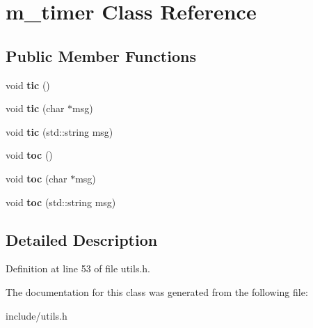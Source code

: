\hypertarget{classm__timer}{\section{m\+\_\+timer Class Reference}
\label{classm__timer}
}
\subsection*{Public Member Functions}
\begin{DoxyCompactItemize}
\item 
\hypertarget{classm__timer_ab4e75df9694f1693273a4766c2d99636}{void {\bfseries tic} ()}\label{classm__timer_ab4e75df9694f1693273a4766c2d99636}

\item 
\hypertarget{classm__timer_a833afaf3686ebe376e15571956399fd0}{void {\bfseries tic} (char $\ast$msg)}\label{classm__timer_a833afaf3686ebe376e15571956399fd0}

\item 
\hypertarget{classm__timer_a8ada933033e5cc9dc48e430a66616e06}{void {\bfseries tic} (std\+::string msg)}\label{classm__timer_a8ada933033e5cc9dc48e430a66616e06}

\item 
\hypertarget{classm__timer_a8b1126faa1d4ec46f724258f25770bff}{void {\bfseries toc} ()}\label{classm__timer_a8b1126faa1d4ec46f724258f25770bff}

\item 
\hypertarget{classm__timer_a7638ace7f392731c895765235360783c}{void {\bfseries toc} (char $\ast$msg)}\label{classm__timer_a7638ace7f392731c895765235360783c}

\item 
\hypertarget{classm__timer_ad351a19d033954aa263e6be6c4266d9f}{void {\bfseries toc} (std\+::string msg)}\label{classm__timer_ad351a19d033954aa263e6be6c4266d9f}

\end{DoxyCompactItemize}


\subsection{Detailed Description}


Definition at line 53 of file utils.\+h.



The documentation for this class was generated from the following file\+:\begin{DoxyCompactItemize}
\item 
include/utils.\+h\end{DoxyCompactItemize}
